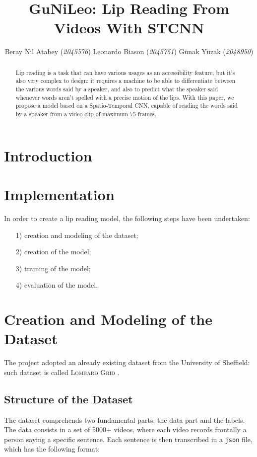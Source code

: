 \documentclass[11pt,journal]{IEEEtran}
\title{GuNiLeo: Lip Reading From Videos With STCNN}
\author{Beray Nil Atabey (\textit{2045576}) \quad Leonardo Biason (\textit{2045751}) \quad Günak Yüzak (\textit{2048950})}
\begin{document}
\maketitle

\begin{abstract}
    Lip reading is a task that can have various usages as an accessibility feature, but it's also very complex to design: it requires a machine to be able to differentiate between the various words said by a speaker, and also to predict what the speaker said whenever words aren't spelled with a precise motion of the lips. With this paper, we propose a model based on a Spatio-Temporal CNN, capable of reading the words said by a speaker from a video clip of maximum 75 frames.
\end{abstract}

\section{Introduction}

\lipsum[1]

\section{Implementation}

In order to create a lip reading model, the following steps have been undertaken:
\begin{itemize}
    \item [1)] creation and modeling of the dataset;
    \item [2)] creation of the model;
    \item [3)] training of the model;
    \item [4)] evaluation of the model.
\end{itemize}

\section{Creation and Modeling of the Dataset}

The project adopted an already existing dataset from the University of Sheffield: such dataset is called \textsc{Lombard Grid} \cite{gunileo:dataset}.

\subsection{Structure of the Dataset}

The dataset comprehends two fundamental parts: the data part and the labels. The data consists in a set of 5000+ videos, where each video records frontally a person saying a specific sentence. Each sentence is then transcribed in a \texttt{json} file, which has the following format:
\end{document}
